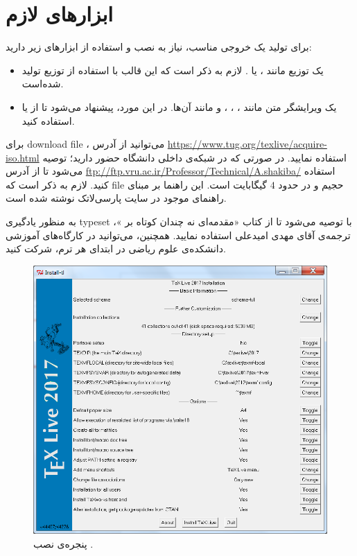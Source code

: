 \chapter{ابزارهای لازم}
	برای تولید یک خروجی مناسب، نیاز به نصب و استفاده از ابزارهای زیر دارید:
	\begin{itemize}
		\item یک توزیع \lr{\LaTeX} مانند ،  یا . لازم به ذکر است که این قالب با استفاده از توزیع  تولید شده‌است.
		\item یک ویرایشگر متن مانند ، ، ،  و مانند آن‌ها. در این مورد، پیشنهاد می‌شود تا از  یا  استفاده کنید.
	\end{itemize}

برای \gls{download} \gls{file} ، می‌توانید از آدرس \url{https://www.tug.org/texlive/acquire-iso.html} استفاده نمایید. در صورتی که در شبکه‌ی داخلی دانشگاه حضور دارید؛ توصیه می‌شود تا از آدرس \url{ftp://ftp.vru.ac.ir/Professor/Technical/A.shakiba/} استفاده کنید. لازم به ذکر است که \gls{file} حجیم و در حدود $4$ گیگابایت است. این راهنما بر مبنای راهنمای موجود در سایت پارسی‌لاتک نوشته شده‌ است.

به منظور یادگیری \gls{typeset} با \lr{\LaTeX} توصیه می‌شود تا از کتاب «مقدمه‌ای نه چندان کوتاه بر \lr{\LaTeX}»، ترجمه‌ی آقای مهدی امیدعلی استفاده نمایید. همچنین، می‌توانید در کارگاه‌های آموزشی دانشکده‌ی علوم ریاضی در ابتدای هر ترم، شرکت کنید.

\begin{figure}
\includegraphics[width=.7\textwidth]{figs/texlive2017.png} 
\caption{پنجره‌ی نصب .}
\end{figure}